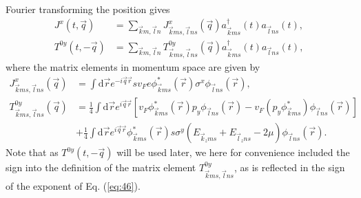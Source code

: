 Fourier transforming the position gives
\begin{align}
  \label{eq:44}
  J^x(t, \vec{q}) &= \sum\limits_{\vec{k}m, \vec{l}n}
                    J^x_{\vec{k}ms, \vec{l}ns}(\vec{q})
                    a^{\dagger}_{\vec{k}ms}(t)
                    a_{\vec{l} ns}(t),\\
  \label{eq:45}
  T^{0y}(t, -\vec{q}) &= \sum\limits_{\vec{k}m, \vec{l}n}^{}
                    T^{0y}_{\vec{k}m s, \vec{l}n s}(\vec{q})
                    a^{\dagger}_{\vec{k}m s}(t)
                    a_{\vec{l} n s}(t),
\end{align}
where the matrix elements in momentum space are given by
\begin{align}
  J^x_{\vec{k}ms, \vec{l}ns}(\vec{q}) &=  \int \mathrm{d} \vec{r} e^{-i \vec{q} \vec{r}} s v_F e \phi ^{*}_{\vec{k}ms} (\vec{r}) \sigma ^x \phi _{\vec{l}ns}(\vec{r}),\\
  \label{eq:46}
  T^{0y}_{\vec{k}m s, \vec{l} n s}(\vec{q}) &= \frac{1}{4} \int \mathrm{d}\vec{r} e^{i\vec{q}\vec{r}} \left[
                                                  v_F \phi ^{*}_{\vec{k} m s}(\vec{r})  p_y \phi _{\vec{l} ns} (\vec{r})
                                                  - v_F (p_y \phi ^{*}_{\vec{k}m s}) \phi _{\vec{l} ns }(\vec{r})
                                                  \right]\\
                                             \nonumber &+ \frac{1}{4}
                                                \int \mathrm{d}\vec{r} e^{i\vec{q}\vec{r}}
                                                \phi ^{*}_{\vec{k}m s}(\vec{r}) s \sigma ^y
                                                (E_{\vec{k}_z m s} + E_{\vec{l}_z n  s} - 2 \mu ) \phi _{\vec{l} n  s}(\vec{r}).
\end{align}
Note that as $T^{0y}(t, -\vec{q})$ will be used later, we here for convenience included the sign into the definition of the matrix element  $T^{0y}_{\vec{k}ms, \vec{l}ns}$, as is reflected in the sign of the exponent of Eq. (\ref{eq:46}).


